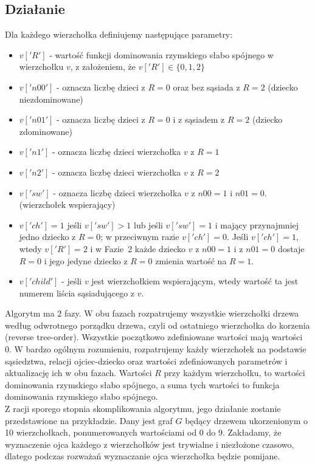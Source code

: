 \subsection{Działanie}

Dla każdego wierzchołka definiujemy następujące parametry:
\begin{itemize}
    \item $v['R']$ - wartość funkcji dominowania rzymskiego słabo spójnego w wierzchołku $v$, z założeniem, że $v['R']\in\{0,1,2\}$
    \item $v['n00']$ - oznacza liczbę dzieci z $R=0$ oraz bez sąsiada z $R=2$ (dziecko niezdominowane)
    \item $v['n01']$ - oznacza liczbę dzieci z $R=0$ i z sąsiadem z $R=2$ (dziecko zdominowane)
    \item $v['n1']$ - oznacza liczbę dzieci wierzchołka $v$ z $R = 1$
    \item $v['n2']$ - oznacza liczbę dzieci wierzchołka $v$ z $R = 2$
    \item $v['sw']$ - oznacza liczbę dzieci wierzchołka $v$ z $n00=1$ i $n01=0$. (wierzchołek wspierający)
    \item $v['ch'] =1$ jeśli $v['sw']>1$ lub jeśli $v['sw']=1$ i mający przynajmniej jedno dziecko z $R=0$; w przeciwnym razie $v['ch'] =0$. Jeśli $v['ch'] =1$, wtedy $v['R']=2$ i w Fazie~2 każde dziecko $v$ z $n00=1$ i z $n01=0$ dostaje $R=0$ i jego jedyne dziecko z $R=0$ zmienia wartość na $R=1$.
    \item $v['child']$ - jeśli $v$ jest wierzchołkiem wspierającym, wtedy wartość ta jest numerem liścia sąsiadującego z $v$.
\end{itemize}

Algorytm ma 2 fazy. W obu fazach rozpatrujemy wszystkie wierzchołki drzewa według odwrotnego porządku drzewa, czyli od ostatniego wierzchołka do korzenia (reverse tree-order). Wszystkie początkowo zdefiniowane wartości mają wartości 0. W bardzo ogólnym rozumieniu, rozpatrujemy każdy wierzchołek na podstawie sąsiedztwa, relacji ojciec-dziecko oraz wartości zdefiniowanych parametrów i aktualizację ich w obu fazach. Wartości $R$ przy każdym wierzchołku, to wartości dominowania rzymskiego słabo spójnego, a suma tych wartości to funkcja dominowania rzymskiego słabo spójnego.
\\
Z racji sporego stopnia skomplikowania algorytmu, jego działanie zostanie przedstawione na przykładzie.
Dany jest graf $G$ będący drzewem ukorzenionym o 10 wierzchołkach, ponumerowanych wartościami od 0 do 9. Zakładamy, że wyznaczenie ojca każdego z wierzchołków jest trywialne i niezłożone czasowo, dlatego podczas rozważań wyznaczanie ojca wierzchołka będzie pomijane.

